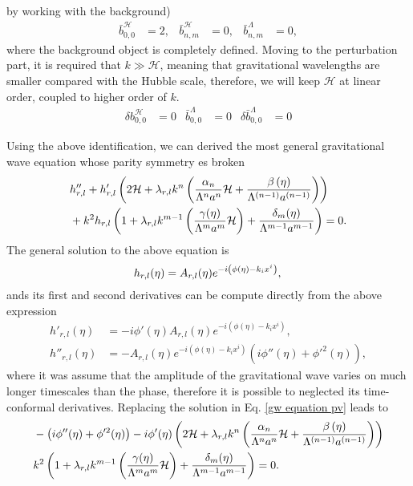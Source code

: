 \documentclass{article}
\begin{document}
by working with the background)
\begin{align}
    \bar{b}^{\mathcal{H}}_{0,0} & = 2, & \bar{b}^{\mathcal{H}}_{n,m} & = 0, & 
    \bar{b}^{\Lambda}_{n,m} & = 0, 
\end{align}
where the background object is completely defined. Moving to the perturbation part, it is required
that $k \gg \mathcal{H}$, meaning that gravitational wavelengths are smaller compared with the Hubble
scale, therefore, we will keep $\mathcal{H}$ at linear order, coupled to higher order of $k$.
\begin{align} 
    \delta b^{\mathcal{H}}_{0,0} & = 0 & \bar{b}^{\Lambda}_{0,0} & = 0 & 
    \delta \bar{b}^{\Lambda}_{0,0} & = 0
\end{align}

Using the above identification, we can derived the most general gravitational wave equation
whose parity symmetry es broken
\begin{align}
    & h''_{r,l} + h'_{r,l}\left(2\mathcal{H} + \lambda_{r,l}k^{n}
    \left(\frac{\alpha_{n}}{\Lambda^n a^n}\mathcal{H} + 
    \frac{\beta\left(\eta\right)}{\Lambda^{(n-1)}a^{(n-1)}}\right)\right) \notag \\ 
    & + k^2 h_{r,l}\left(1 + \lambda_{r,l}k^{m-1}
    \left(\frac{\gamma(\eta)}{\Lambda^m a^m}\mathcal{H}\right) 
    + \frac{\delta_{m}(\eta)}{\Lambda^{m-1}a^{m-1}}\right) = 0.
\end{align}
The general solution to the above equation is
\begin{equation}
    h_{r,l}(\eta)  = A_{r,l}(\eta)e^{-i\left(\phi(\eta) -k_{i}x^{i}\right)}, \\
\end{equation} 
ands its first and second derivatives can be compute directly from the above expression 
\begin{align}
    h'_{r,l}(\eta) & = -i\phi'(\eta)A_{r,l}(\eta)e^{-i\left(\phi(\eta) -k_{i}x^{i}\right)}, \\
    h''_{r,l}(\eta) & = -A_{r,l}(\eta)e^{-i\left(\phi(\eta) -k_{i}x^{i}\right)} 
    \left(i\phi''(\eta) + \phi'^{2}(\eta)\right),
\end{align} 
where it was assume that the amplitude of the gravitational wave varies 
on much longer timescales than the phase, therefore it is possible to neglected its 
time-conformal derivatives. Replacing the solution in Eq. \eqref{gw equation pv} leads to
\begin{align}
    & -\left(i\phi''(\eta) + \phi'^{2}(\eta)\right) -i\phi'(\eta)
    \left(2\mathcal{H} + \lambda_{r,l}k^{n}
    \left(\frac{\alpha_{n}}{\Lambda^n a^n}\mathcal{H} + 
    \frac{\beta\left(\eta\right)}{\Lambda^{(n-1)}a^{(n-1)}}\right)\right) \notag \\
    & k^2 \left(1 + \lambda_{r,l}k^{m-1}
    \left(\frac{\gamma(\eta)}{\Lambda^m a^m}\mathcal{H}\right) 
    + \frac{\delta_{m}(\eta)}{\Lambda^{m-1}a^{m-1}}\right) = 0.
\end{align}
\end{document}
